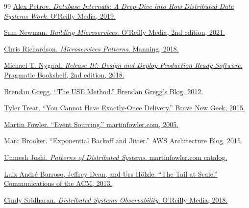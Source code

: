 \begin{thebibliography}{99}
\href{https://www.oreilly.com/library/view/database-internals/9781492040330/}{Alex Petrov. \textit{Database Internals: A Deep Dive into How Distributed Data Systems Work}. O'Reilly Media, 2019.}

\href{https://samnewman.io/books/building_microservices_2nd_edition/}{Sam Newman. \textit{Building Microservices}. O'Reilly Media, 2nd edition, 2021.}

\href{https://www.manning.com/books/microservices-patterns}{Chris Richardson. \textit{Microservices Patterns}. Manning, 2018.}

\href{https://pragprog.com/titles/mnee2/release-it-second-edition/}{Michael T. Nygard. \textit{Release It!: Design and Deploy Production-Ready Software}. Pragmatic Bookshelf, 2nd edition, 2018.}

\href{https://www.brendangregg.com/usemethod.html}{Brendan Gregg. ``The USE Method.'' Brendan Gregg's Blog, 2012.}

\href{https://bravenewgeek.com/you-cannot-have-exactly-once-delivery/}{Tyler Treat. ``You Cannot Have Exactly-Once Delivery.'' Brave New Geek, 2015.}

\href{https://martinfowler.com/eaaDev/EventSourcing.html}{Martin Fowler. ``Event Sourcing.'' martinfowler.com, 2005.}

\href{https://aws.amazon.com/blogs/architecture/exponential-backoff-and-jitter/}{Marc Brooker. ``Exponential Backoff and Jitter.'' AWS Architecture Blog, 2015.}

\href{https://martinfowler.com/articles/patterns-of-distributed-systems/}{Unmesh Joshi. \textit{Patterns of Distributed Systems}. martinfowler.com catalog.}

\href{https://research.google/pubs/the-tail-at-scale/}{Luiz André Barroso, Jeffrey Dean, and Urs Hölzle. ``The Tail at Scale.'' Communications of the ACM, 2013.}

\href{https://www.oreilly.com/library/view/distributed-systems-observability/9781492033431/}{Cindy Sridharan. \textit{Distributed Systems Observability}. O'Reilly Media, 2018.}

\end{thebibliography}


